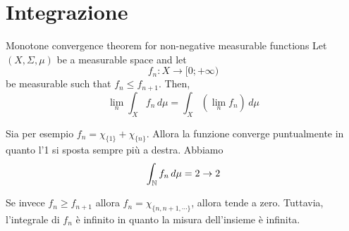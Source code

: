 \documentclass[a4paper]{article}
\begin{document}

\section{Integrazione}

\begin{radioactive}
\begin{snippettheorem}{Monotone convergence theorem for non-negative measurable functions}
    Let \((X, \Sigma, \mu)\) be a measurable space and let
    \[
        f_n \colon X \to [0; +\infty)
    \] be measurable
    such that \(f_n \leq f_{n+1}\). Then,
    \[
        \lim_n \int_X f_n\,d\mu = \int_X (\lim_n f_n)\,d\mu
    \]
\end{snippettheorem}
\end{radioactive}

Sia per esempio \(f_n = \chi_{\{1\}} + \chi_{\{n\}}\).
Allora la funzione converge puntualmente in quanto l'1 si sposta sempre più a destra.
Abbiamo
\[
    \int_{\mathbb{N}} f_n \,d\mu = 2 \to 2
\]

Se invece \(f_n \geq f_{n+1}\) allora \(f_n = \chi_{\{n, n+1, \cdots\}}\), allora tende a zero.
Tuttavia, l'integrale di \(f_n\) è infinito in quanto la misura dell'insieme è infinita.
\end{document}
